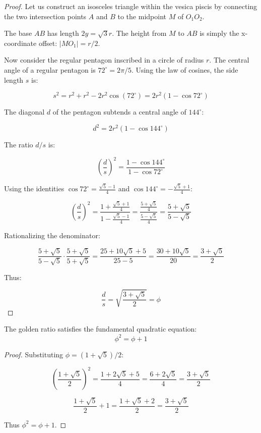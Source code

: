 \begin{proof}
Let us construct an isosceles triangle within the vesica piscis by connecting the two intersection points $A$ and $B$ to the midpoint $M$ of $O_1 O_2$.

The base $AB$ has length $2y = \sqrt{3}r$. The height from $M$ to $AB$ is simply the x-coordinate offset: $|M O_1| = r/2$.

Now consider the regular pentagon inscribed in a circle of radius $r$. The central angle of a regular pentagon is $72^\circ = 2\pi/5$. Using the law of cosines, the side length $s$ is:

\[
s^2 = r^2 + r^2 - 2r^2 \cos(72^\circ) = 2r^2(1 - \cos 72^\circ)
\]

The diagonal $d$ of the pentagon subtends a central angle of $144^\circ$:

\[
d^2 = 2r^2(1 - \cos 144^\circ)
\]

The ratio $d/s$ is:

\[
\left(\frac{d}{s}\right)^2 = \frac{1 - \cos 144^\circ}{1 - \cos 72^\circ}
\]

Using the identities $\cos 72^\circ = \frac{\sqrt{5}-1}{4}$ and $\cos 144^\circ = -\frac{\sqrt{5}+1}{4}$:

\[
\left(\frac{d}{s}\right)^2 = \frac{1 + \frac{\sqrt{5}+1}{4}}{1 - \frac{\sqrt{5}-1}{4}} = \frac{\frac{5+\sqrt{5}}{4}}{\frac{5-\sqrt{5}}{4}} = \frac{5+\sqrt{5}}{5-\sqrt{5}}
\]

Rationalizing the denominator:

\[
\frac{5+\sqrt{5}}{5-\sqrt{5}} \cdot \frac{5+\sqrt{5}}{5+\sqrt{5}} = \frac{25 + 10\sqrt{5} + 5}{25 - 5} = \frac{30 + 10\sqrt{5}}{20} = \frac{3 + \sqrt{5}}{2}
\]

Thus:

\[
\frac{d}{s} = \sqrt{\frac{3 + \sqrt{5}}{2}} = \phi
\]

\end{proof}

\begin{corollary}
The golden ratio satisfies the fundamental quadratic equation:
\[
\phi^2 = \phi + 1
\]
\end{corollary}

\begin{proof}
Substituting $\phi = (1+\sqrt{5})/2$:

\[
\left(\frac{1+\sqrt{5}}{2}\right)^2 = \frac{1 + 2\sqrt{5} + 5}{4} = \frac{6 + 2\sqrt{5}}{4} = \frac{3 + \sqrt{5}}{2}
\]

\[
\frac{1+\sqrt{5}}{2} + 1 = \frac{1+\sqrt{5} + 2}{2} = \frac{3 + \sqrt{5}}{2}
\]

Thus $\phi^2 = \phi + 1$.
\end{proof}

